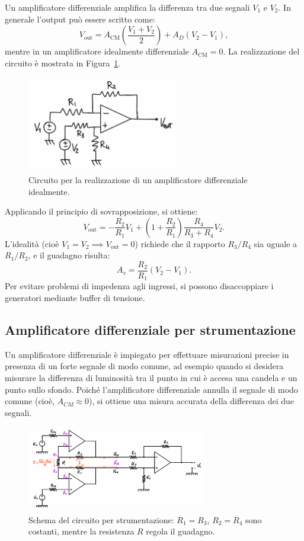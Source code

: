 Un amplificatore differenziale amplifica la differenza tra due segnali \(V_1\) e \(V_2\). In generale l'output può essere scritto come:
\[
V_{\text{out}} = A_{\text{CM}} \left(\frac{V_1+V_2}{2}\right) + A_D (V_2-V_1),
\]
mentre in un amplificatore idealmente differenziale \(A_{\text{CM}} = 0\). La realizzazione del circuito è mostrata in Figura~\ref{fig:amp_diff}.\\[2mm]
\begin{figure}[H]
    \centering
    \includegraphics[width=0.6\textwidth]{images/1.5.1.1.png}
    \caption{Circuito per la realizzazione di un amplificatore differenziale idealmente.}
    \label{fig:amp_diff}
\end{figure}

Applicando il principio di sovrapposizione, si ottiene:
\[
V_{\text{out}} = -\frac{R_2}{R_1} V_1 + \left(1+\frac{R_2}{R_1}\right)\frac{R_4}{R_3+R_4}V_2.
\]
L'idealità (cioè \(V_1=V_2 \implies V_{\text{out}}=0\)) richiede che il rapporto \(R_3/R_4\) sia uguale a \(R_1/R_2\), e il guadagno risulta:
\[
A_v = \frac{R_2}{R_1}(V_2-V_1).
\]
Per evitare problemi di impedenza agli ingressi, si possono disaccoppiare i generatori mediante buffer di tensione.
\newpage

\subsection{Amplificatore differenziale per strumentazione}

Un amplificatore differenziale è impiegato per effettuare misurazioni precise in presenza di un forte segnale di modo comune, ad esempio quando si desidera misurare la differenza di luminosità tra il punto in cui è accesa una candela e un punto sullo sfondo. Poiché l’amplificatore differenziale annulla il segnale di modo comune (cioè, \(A_{CM} \approx 0\)), si ottiene una misura accurata della differenza dei due segnali.\\[2mm]
\begin{figure}[H]
  \centering
  \includegraphics[width=0.7\textwidth]{images/1.5.2.1.png}
  \caption{Schema del circuito per strumentazione: \(R_1 = R_3\), \(R_2 = R_4\) sono costanti, mentre la resistenza \(R\) regola il guadagno.}
  \label{fig:amp_diff_strumentazione}
\end{figure}

